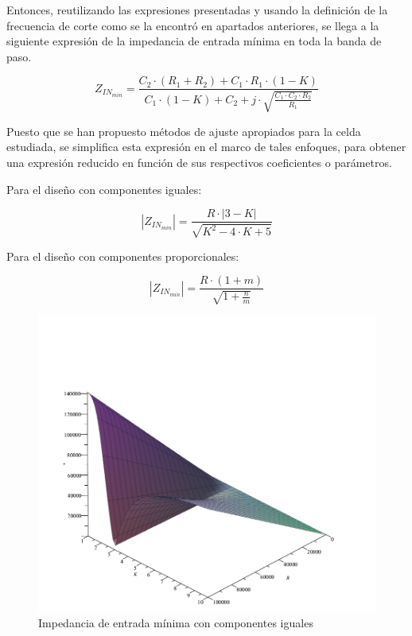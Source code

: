 Entonces, reutilizando las expresiones presentadas y usando la definici\'on de la frecuencia de corte como se la encontr\'o en apartados anteriores, se llega a la siguiente expresi\'on de la impedancia de entrada
m\'inima en toda la banda de paso.

\begin{equation}
Z_{IN_{min}} = \frac{C_2 \cdot (R_1 + R_2) + C_1 \cdot R_1 \cdot (1 - K)}{C_1 \cdot (1 - K) + C_2 + j \cdot \sqrt{\frac{C_1 \cdot C_2 \cdot R_2}{R_1}}}
\end{equation}

Puesto que se han propuesto m\'etodos de ajuste apropiados para la celda estudiada, se simplifica esta expresi\'on en el marco de tales enfoques, para obtener una expresi\'on
reducido en funci\'on de sus respectivos coeficientes o par\'ametros.

Para el dise\~no con componentes iguales:

\begin{equation}
|Z_{IN_{min}}| = \frac{R \cdot |3 - K|}{\sqrt{K^{2} - 4 \cdot K + 5}}
\label{eq:impedancia_minima_componentes_iguales}
\end{equation}

Para el dise\~no con componentes proporcionales:

\begin{equation}
|Z_{IN_{min}}| = \frac{R \cdot (1 + m)}{\sqrt{1 + \frac{n}{m}}}
\label{eq:impedancia_minima_componentes_proporcionales}
\end{equation}

\begin{figure}[H]
	\centering
	\includegraphics[scale=0.45]{../EJ1/Recursos/impedancia_entrada_componentes_iguales.png}
	\caption{Impedancia de entrada m\'inima con componentes iguales}
\end{figure}


